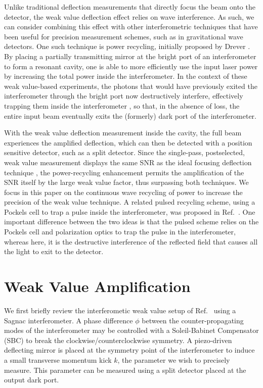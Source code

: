 Unlike traditional deflection measurements that directly focus the beam onto the detector, the weak value deflection effect relies on wave interference.  As such, we can consider combining this effect with other interferometric techniques that have been useful for precision measurement schemes, such as in gravitational wave detectors. One such technique is power recycling, initially proposed by Drever \cite{Drever1983}.  By placing a partially transmitting mirror at the bright port of an interferometer to form a resonant cavity, one is able to more efficiently use the input laser power by increasing the total power inside the interferometer.  In the context of these weak value-based experiments, the photons that would have previously exited the interferometer through the bright port now destructively interfere, effectively trapping them inside the interferometer , so that, in the absence of loss, the entire input beam eventually exits the (formerly) dark port of the interferometer.

With the weak value deflection measurement inside the cavity, the full beam experiences the amplified deflection, which can then be detected with a position sensitive detector, such as a split detector.  Since the single-pass, postselected, weak value measurement displays the same SNR as the ideal focusing deflection technique \cite{Starling2010,Jordan2014,Viza2014}, the power-recycling enhancement permits the amplification of the SNR itself by the large weak value factor, thus surpassing both techniques.  We focus in this paper on the continuous wave recycling of power to increase the precision of the weak value technique. A related pulsed recycling scheme, using a Pockels cell to trap a pulse inside the interferometer, was proposed in Ref.~\cite{Dressel2013}.  One important difference between the two ideas is that the pulsed scheme relies on the Pockels cell and polarization optics to trap the pulse in the interferometer, whereas here, it is the destructive interference of the reflected field that causes all the light to exit to the detector.



\section{Weak Value Amplification}
We first briefly review the interferometic weak value setup of Ref.~\cite{Dixon2009} using a Sagnac interferometer.  A phase difference $\phi$ between the counter-propagating modes of the interferometer may be controlled with a Soleil-Babinet Compensator (SBC) to break the clockwise/counterclockwise symmetry. A piezo-driven deflecting mirror is placed at the symmetry point of the interferometer to induce a small transverse momentum kick $k$, the parameter we wish to precisely measure. This parameter can be measured using a split detector placed at the output dark port.  

